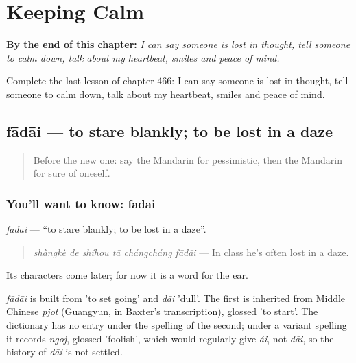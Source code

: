 
\chapter{Keeping Calm}
\label{ch:zh-keeping-calm}

\begin{chapteropening}
\textbf{By the end of this chapter:} \emph{I can say someone is lost in thought, tell someone to calm down, talk about my heartbeat, smiles and peace of mind.}

Complete the last lesson of chapter 466: I can say someone is lost in thought, tell someone to calm down, talk about my heartbeat, smiles and peace of mind.
\end{chapteropening}

\section[fādāi]{fādāi — to stare blankly; to be lost in a daze}

\label{lesson:ZH-C466-fadai}



\begin{quote}
Before the new one: say the Mandarin for pessimistic, then the Mandarin for sure of oneself.
\end{quote}

\subsection*{You'll want to know: fādāi}
\emph{fādāi} — \textquotedblleft{}to stare blankly; to be lost in a daze\textquotedblright{}.

\begin{quote}
\emph{shàngkè de shíhou tā chángcháng fādāi} — In class he's often lost in a daze.
\end{quote}

Its characters come later; for now it is a word for the ear.

\begin{cousinweb}
\emph{fādāi} is built from  'to set going' and \emph{dāi} 'dull'. The first is inherited from Middle Chinese \emph{pjot} (Guangyun, in Baxter's transcription), glossed 'to start'. The dictionary has no entry under the spelling of the second; under a variant spelling it records \emph{ngoj}, glossed 'foolish', which would regularly give \emph{ái}, not \emph{dāi}, so the history of \emph{dāi} is not settled.
\end{cousinweb}

